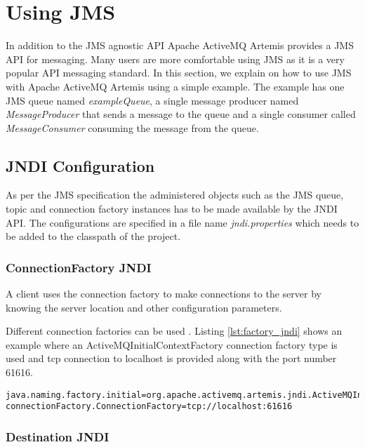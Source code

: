 \section{Using JMS}

In addition to the JMS agnostic API Apache ActiveMQ Artemis provides a JMS API for messaging. Many users are more comfortable using JMS as it is a very popular API messaging standard. In this section, we explain on how to use JMS with Apache ActiveMQ Artemis using a simple example. The example has one JMS queue named \textit{exampleQueue}, a single message producer named \textit{MessageProducer} that sends a message to the queue and a single consumer called \textit{MessageConsumer} consuming the message from the queue.

\subsection{JNDI Configuration}

As per the JMS specification the administered objects such as the JMS queue, topic and connection factory instances has to be made available by the JNDI API. The configurations are specified in a file name \textit{jndi.properties} which needs to be added to the classpath of the project.

\subsubsection{ConnectionFactory JNDI}

A client uses the connection factory to make connections to the server by knowing the server location and other configuration parameters. 

Different connection factories can be used \parencite{jms_cf}. Listing \ref{lst:factory_jndi} shows an example where an ActiveMQInitialContextFactory connection factory type is used and tcp connection to localhost is provided along with the port number 61616.

\bigskip
\begin{lstlisting}[style=BashInputStyle,caption=ConnectionFactory JNDI, label={lst:factory_jndi}]
java.naming.factory.initial=org.apache.activemq.artemis.jndi.ActiveMQInitialContextFactory
connectionFactory.ConnectionFactory=tcp://localhost:61616
\end{lstlisting}

\subsubsection{Destination JNDI}

